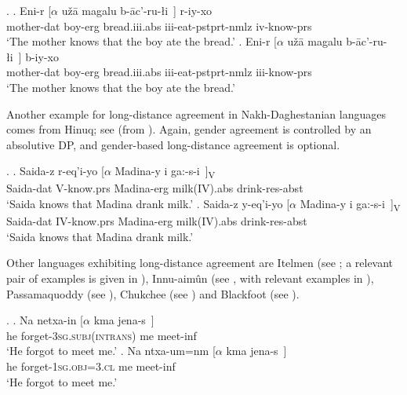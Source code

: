 \documentclass[output=paper
,modfonts
,nonflat]{langsci/langscibook}
\begin{document}
\Lsciexi.  \label{2}
\ag. Eni-r [$\alpha$ u\v{z}\={a} magalu b-\={a}c'-ru-\l i~] r-iy-xo \\
     mother-{\sc dat} {} boy-{\sc erg} bread.{\sc iii.abs} {\sc iii}-eat-{\sc pstprt-nmlz} {\sc iv}-know-{\sc prs} \\
 `The mother knows that the boy ate the bread.'
\bg.  Eni-r [$\alpha$ u\v{z}\={a} \label{2-b}magalu b-\={a}c'-ru-\l i~] b-iy-xo \\
     mother-{\sc dat} {} boy-{\sc erg} bread.{\sc iii.abs} {\sc iii}-eat-{\sc pstprt-nmlz} {\sc iii}-know-{\sc prs} \\
      `The mother knows that the boy ate the bread.'

Another example for long-distance agreement in Nakh-Daghestanian
languages comes from Hinuq; see \Next[ab] (from
\cite{Forker:11}). Again, gender agreement is controlled by an
absolutive DP, and gender-based long-distance agreement is optional.

\Lsciexi. \label{3}
\ag.  Sa\textbarglotstop ida-z r-eq'i-yo [$\alpha$ Madina-y \textgamma i ga:-s-\textbeltl i~]\textsubscript{V} \\
      Saida-{\sc dat} {V}-know.{\sc prs} {} Madina-{\sc erg} milk(IV).{\sc abs} drink-{\sc res-abst} \\ 
 `Saida knows that Madina drank milk.'
\bg.  Sa\textbarglotstop ida-z y-eq'i-yo [$\alpha$ \label{3-b}Madina-y \textgamma i ga:-s-\textbeltl i~]\textsubscript{V} \\
       Saida-{\sc dat} {IV}-know.{\sc prs} {} Madina-{\sc erg} milk({IV}).{\sc abs} drink-{\sc res-abst} \\
      `Saida knows that Madina drank milk.'

Other languages exhibiting long-distance agreement are Itelmen (see
\cite{Bobaljik&Wurmbrand:05}; a relevant pair of examples is given in
\Next), Innu-aim\^{u}n (see \cite{Branigan&MacKenzie:02}, with
relevant examples in \NNext), Passamaquoddy (see \cite{Bruening:01}),
Chukchee (see \cite{Boskovic:07}) and Blackfoot (see \cite{Bliss:09}).

\Lsciexi. \label{4}
\ag.  Na netxa-in [$\alpha$ kma jena-s~] \\
     he forget-{{\scshape 3sg.subj(intrans)}} {} me meet-{\sc inf} \\
      `He forgot to meet me.'
\bg.  Na ntxa-um=nm [$\alpha$ kma jena-s~] \\
     he forget-{{\scshape 1sg.obj=3.cl}} {} {me} meet-{\sc inf} \\
      `He forgot to meet me.'
\end{document}
